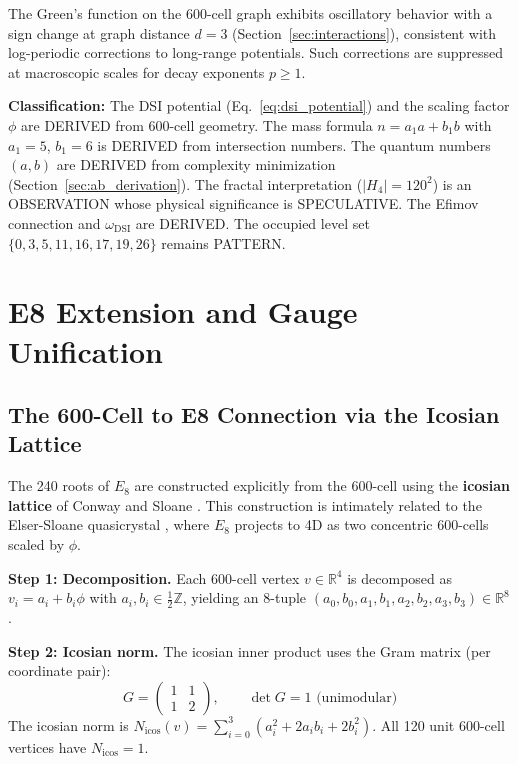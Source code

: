 \documentclass[12pt,a4paper]{article}
\begin{document}
The Green's function on the 600-cell graph exhibits oscillatory behavior with a sign change at graph distance $d = 3$ (Section~\ref{sec:interactions}), consistent with log-periodic corrections to long-range potentials. Such corrections are suppressed at macroscopic scales for decay exponents $p \geq 1$.

\textbf{Classification:} The DSI potential (Eq.~\ref{eq:dsi_potential}) and the scaling factor $\phi$ are DERIVED from 600-cell geometry. The mass formula $n = a_1 a + b_1 b$ with $a_1 = 5$, $b_1 = 6$ is DERIVED from intersection numbers. The quantum numbers $(a,b)$ are DERIVED from complexity minimization (Section~\ref{sec:ab_derivation}). The fractal interpretation ($|H_4| = 120^2$) is an OBSERVATION whose physical significance is SPECULATIVE. The Efimov connection and $\omega_{\text{DSI}}$ are DERIVED. The occupied level set $\{0, 3, 5, 11, 16, 17, 19, 26\}$ remains PATTERN.


\section{E8 Extension and Gauge Unification}

\subsection{The 600-Cell to E8 Connection via the Icosian Lattice}
\label{sec:e8}

The 240 roots of $E_8$ are constructed explicitly from the 600-cell using the \textbf{icosian lattice} of Conway and Sloane \cite{conway1998icosian}. This construction is intimately related to the Elser-Sloane quasicrystal \cite{elser1987}, where $E_8$ projects to 4D as two concentric 600-cells scaled by $\phi$.

\textbf{Step 1: Decomposition.} Each 600-cell vertex $v \in \mathbb{R}^4$ is decomposed as $v_i = a_i + b_i\phi$ with $a_i, b_i \in \frac{1}{2}\mathbb{Z}$, yielding an 8-tuple $(a_0, b_0, a_1, b_1, a_2, b_2, a_3, b_3) \in \mathbb{R}^8$.

\textbf{Step 2: Icosian norm.} The icosian inner product uses the Gram matrix (per coordinate pair):
\begin{equation}
G = \begin{pmatrix} 1 & 1 \\ 1 & 2 \end{pmatrix}, \qquad \det G = 1 \text{ (unimodular)}
\end{equation}
The icosian norm is $N_{\text{icos}}(v) = \sum_{i=0}^{3}(a_i^2 + 2a_i b_i + 2b_i^2)$. All 120 unit 600-cell vertices have $N_{\text{icos}} = 1$.
\end{document}
